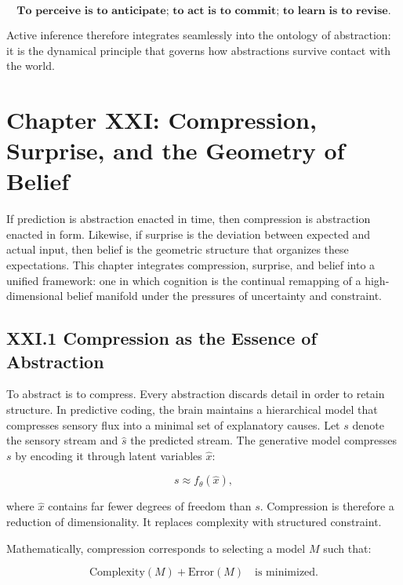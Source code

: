 \documentclass[12pt,letterpaper]{article}
\begin{document}
\[
\textbf{To perceive is to anticipate; to act is to commit; to learn is to revise.}
\]

Active inference therefore integrates seamlessly into the ontology of abstraction:  
it is the dynamical principle that governs how abstractions survive contact with the world.

\newpage
\section{Chapter XXI: Compression, Surprise, and the Geometry of Belief}

If prediction is abstraction enacted in time, then compression is abstraction enacted in form. Likewise, if surprise is the deviation between expected and actual input, then belief is the geometric structure that organizes these expectations. This chapter integrates compression, surprise, and belief into a unified framework: one in which cognition is the continual remapping of a high-dimensional belief manifold under the pressures of uncertainty and constraint.

\subsection{XXI.1 Compression as the Essence of Abstraction}

To abstract is to compress. Every abstraction discards detail in order to retain structure. In predictive coding, the brain maintains a hierarchical model that compresses sensory flux into a minimal set of explanatory causes. Let \(s\) denote the sensory stream and \(\hat{s}\) the predicted stream. The generative model compresses \(s\) by encoding it through latent variables \(\hat{x}\):

\[
s \approx f_\theta(\hat{x}),
\]

where \(\hat{x}\) contains far fewer degrees of freedom than \(s\).  
Compression is therefore a reduction of dimensionality. It replaces complexity with structured constraint.

Mathematically, compression corresponds to selecting a model \(M\) such that:

\[
\text{Complexity}(M) + \text{Error}(M) \quad \text{is minimized.}
\]
\end{document}
